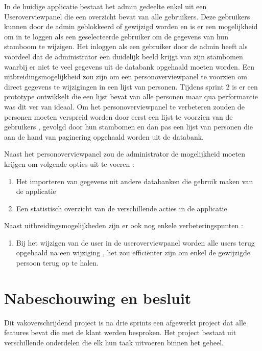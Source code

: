 \documentclass[pdftex,a4paper,12pt,twoside]{report}
\begin{document}
In de huidige applicatie bestaat het admin gedeelte enkel uit een Useroverviewpanel die een overzicht bevat van alle gebruikers.
Deze gebruikers kunnen door de admin geblokkeerd of gewijzigd worden en is er een mogelijkheid om in te loggen als een geselecteerde gebruiker om de gegevens van hun stamboom te wijzigen.
Het inloggen als een gebruiker door de admin heeft als voordeel dat de administrator een duidelijk beeld krijgt van zijn stambomen waarbij er niet te veel gegevens uit de databank opgehaald moeten worden.
Een uitbreidingsmogelijkheid zou zijn om een personoverviewpanel te voorzien om direct gegevens te wijzigingen in een lijst van personen.
Tijdens sprint 2 is er een prototype ontwikkelt die een lijst bevat van alle personen maar qua performantie was dit ver van ideaal.
Om het personoverviewpanel te verbeteren zouden de personen moeten verspreid worden door eerst een lijst te voorzien van de gebruikers , gevolgd door hun stambomen en dan pas een lijst van personen die aan de hand van paginering opgehaald worden uit de databank. 

Naast het personoverviewpanel zou de administrator de mogelijkheid moeten krijgen om volgende opties uit te voeren :
\begin{enumerate}
\item \label{it:first} Het importeren van gegevens uit andere databanken die gebruik maken van de applicatie
\item \label{it:first} Een statistisch overzicht van de verschillende acties in de applicatie
\end{enumerate}









Naast uitbreidingsmogelijkheden zijn er ook nog enkele verbeteringspunten :

\begin{enumerate}
\item \label{it:first} Bij het wijzigen van de user in de useroverviewpanel worden alle users terug opgehaald na een wijziging , het zou efficiënter zijn om enkel de gewijzigde persoon terug op te halen.
\end{enumerate}



\chapter{Nabeschouwing en besluit}
Dit vakoverschrijdend project is na drie sprints een afgewerkt project dat alle features bevat die met de klant werden besproken. Het project bestaat uit verschillende onderdelen die elk hun taak uitvoeren binnen het geheel.
\end{document}
